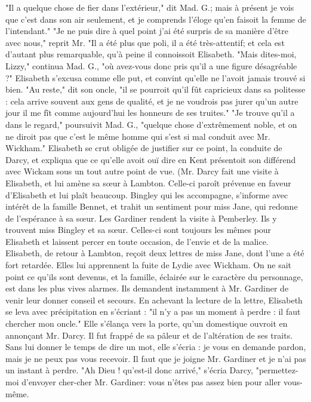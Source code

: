 "Il a quelque chose de fier dans l'extérieur," dit Mad. G.; mais à présent je vois
que c'est dans son air seulement, et je comprends l'éloge qu'en faisoit la femme de l'intendant."
"Je ne puis dire à quel point j'ai été surpris de sa manière d'être avec nous," reprit Mr. "Il a été plus que poli, il a été très-attentif;\setcounter{page}{113} et cela est d'autant plus remarquable, qu'à peine il connoissoit Elisabeth.
"Mais dites-moi, Lizzy," continua Mad. G., "où avez-vous donc pris qu'il a une figure désagréable ?"
Elisabeth s'excusa comme elle put, et convint qu'elle ne l'avoit jamais trouvé si bien.
"Au reste," dit son oncle, "il se pourroit qu'il fût capricieux dans sa politesse : cela arrive souvent aux gens de qualité, et je ne voudrois pas jurer qu'un autre jour il me fît comme aujourd'hui les honneurs de ses truites."
"Je trouve qu'il a dans le regard," poursuivit Mad. G., "quelque chose d'extrêmement noble, et on ne diroit pas que c'est le même homme qui s'est si mal conduit avec Mr. Wickham."
Elisabeth se crut obligée de justifier sur ce point, la conduite de Darcy, et expliqua que ce qu'elle avoit ouï dire en Kent présentoit son différend avec Wickam sous un tout autre point de vue.
(Mr. Darcy fait une visite à Elisabeth, et lui amène sa sœur à Lambton. Celle-ci paroît prévenue en faveur d'Elisabeth et lui plaît beaucoup. Bingley qui les accompagne, s'informe avec intérêt de la famille Bennet, \setcounter{page}{114} et trahit un sentiment pour miss Jane, qui redonne de l'espérance à sa sœur. Les Gardiner rendent la visite à Pemberley. Ils y trouvent miss Bingley et sa sœur. Celles-ci sont toujours les mêmes pour Elisabeth et laissent percer en toute occasion, de l'envie et de la malice. Elisabeth, de retour à Lambton, reçoit deux lettres de miss Jane, dont l'une a été fort retardée. Elles lui apprennent la fuite de Lydie avec Wickham. On ne sait point ce qu'ils sont devenus, et la famille, éclairée sur le caractère du personnage, est dans les plus vives alarmes. Ils demandent instamment à Mr. Gardiner de venir leur donner conseil et secours. En achevant la lecture de la lettre, Elisabeth se leva avec précipitation en s'écriant : "il n'y a pas un moment à perdre : il faut chercher mon oncle." Elle s'élança vers la porte, qu'un domestique ouvroit en annonçant Mr. Darcy. Il fut frappé de sa pâleur et de l'altération de ses traits. Sans lui donner le temps de dire un mot, elle s'écria : je vous en demande pardon, mais je ne peux pas vous recevoir. Il faut que je joigne Mr. Gardiner et je n'ai pas un instant à perdre. "Ah Dieu ! qu'est-il donc arrivé," s'écria Darcy, "permettez-moi d'envoyer cher-cher\setcounter{page}{115} Mr. Gardiner: vous n'êtes pas assez bien pour aller vous-même.
